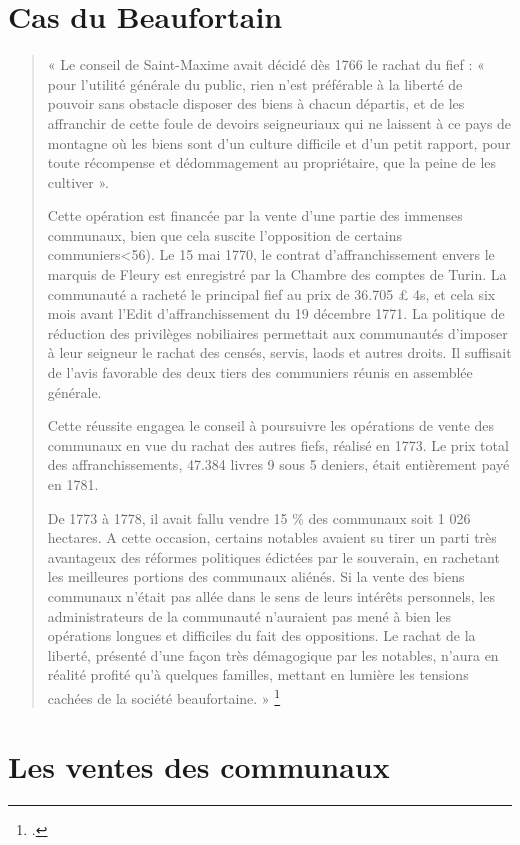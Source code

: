 \documentclass[12pt,a4paper]{report}
\begin{document}
\section{Cas du Beaufortain}
\begin{quote}
	« Le conseil de Saint-Maxime avait décidé dès 1766 le rachat du fief : « pour l'utilité générale du public, rien n'est préférable à la liberté de pouvoir sans obstacle disposer des biens à chacun départis, et de les affranchir de cette foule de devoirs seigneuriaux qui ne laissent à ce pays de montagne où les biens sont d'un culture difficile et d'un petit rapport, pour toute récompense et dédommagement au propriétaire, que la peine de les cultiver ».
	
	Cette opération est financée par la vente d'une partie des immenses communaux, bien que cela suscite l'opposition de certains communiers<56). Le 15 mai 1770, le contrat d'affranchissement envers le marquis de Fleury est enregistré par la Chambre des comptes de Turin. La communauté a racheté le principal fief au prix de 36.705 £ 4s, et cela six mois avant l'Edit d'affranchissement du 19 décembre 1771. La politique de réduction des privilèges nobiliaires permettait aux communautés d'imposer à leur seigneur le rachat des censés, servis, laods et autres droits. Il suffisait de l'avis favorable des deux tiers des communiers réunis en assemblée générale.
	
	Cette réussite engagea le conseil à poursuivre les opérations de vente des communaux en vue du rachat des autres fiefs, réalisé en 1773. Le prix total des affranchissements, 47.384 livres 9 sous 5 deniers, était entièrement payé en 1781.
	
	De 1773 à 1778, il avait fallu vendre 15 \% des communaux soit 1 026 hectares. A cette occasion, certains notables avaient su tirer un parti très avantageux des réformes politiques édictées par le souverain, en rachetant les meilleures portions des communaux aliénés. Si la vente des biens communaux n'était pas allée dans le sens de leurs intérêts personnels, les administrateurs de la communauté n'auraient pas mené à bien les opérations longues et difficiles du fait des oppositions. Le rachat de la liberté, présenté d'une façon très démagogique par les notables, n'aura en réalité profité qu'à quelques familles, mettant en lumière les tensions cachées de la société beaufortaine. »
	\footcite[32]{HViallet1993}
\end{quote}


\section{Les ventes des communaux}
\end{document}
